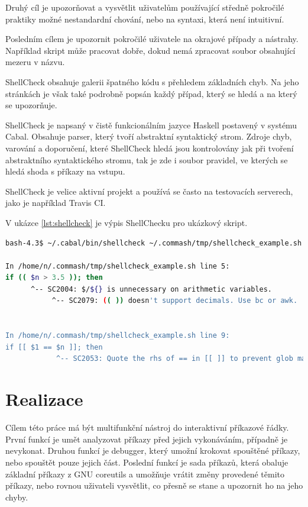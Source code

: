 \documentclass[thesis=M,czech]{FITthesis}[2012/06/26]
\begin{document}
Druhý cíl je upozorňovat a vysvětlit uživatelům používající středně pokročilé praktiky možné nestandardní chování, nebo na syntaxi, která není intuitivní.

Posledním cílem je upozornit pokročilé uživatele na okrajové případy a nástrahy. Například skript může pracovat dobře, dokud nemá zpracovat soubor obsahující mezeru v názvu.

ShellCheck obsahuje galerii špatného kódu s přehledem základních chyb. Na jeho stránkách je však také podrobně popsán každý případ, který se hledá a na který se upozorňuje.

ShellCheck je napsaný v čistě funkcionálním jazyce Haskell postavený v systému Cabal. Obsahuje parser, který tvoří abstraktní syntaktický strom. Zdroje chyb, varování a doporučení, které ShellCheck hledá jsou kontrolovány jak při tvoření abstraktního syntaktického stromu, tak je zde i soubor pravidel, ve kterých se hledá shoda s příkazy na vstupu.

ShellCheck je velice aktivní projekt a používá se často na testovacích serverech, jako je například Travis CI.

V ukázce \ref{lst:shellcheck} je výpis ShellChecku pro ukázkový skript.

\begin{minipage}{\linewidth}
\begin{lstlisting}[language=bash, caption={ShellCheck}, label={lst:shellcheck}]
bash-4.3$ ~/.cabal/bin/shellcheck ~/.commash/tmp/shellcheck_example.sh

In /home/n/.commash/tmp/shellcheck_example.sh line 5:
if (( $n > 3.5 )); then
      ^-- SC2004: $/${} is unnecessary on arithmetic variables.
           ^-- SC2079: (( )) doesn't support decimals. Use bc or awk.


In /home/n/.commash/tmp/shellcheck_example.sh line 9:
if [[ $1 == $n ]]; then
            ^-- SC2053: Quote the rhs of == in [[ ]] to prevent glob matching.
\end{lstlisting}
\end{minipage}



\chapter{Realizace}

Cílem této práce má být multifunkční nástroj do interaktivní příkazové řádky. První funkcí je umět analyzovat příkazy před jejich vykonáváním, případně je nevykonat. Druhou funkcí je debugger, který umožní krokovat spouštěné příkazy, nebo spouštět pouze jejich část. Poslední funkcí je sada příkazů, která obaluje základní příkazy z GNU coreutils a umožňuje vrátit změny provedené těmito příkazy, nebo rovnou uživateli vysvětlit, co přesně se stane a upozornit ho na jeho chyby.
\end{document}
